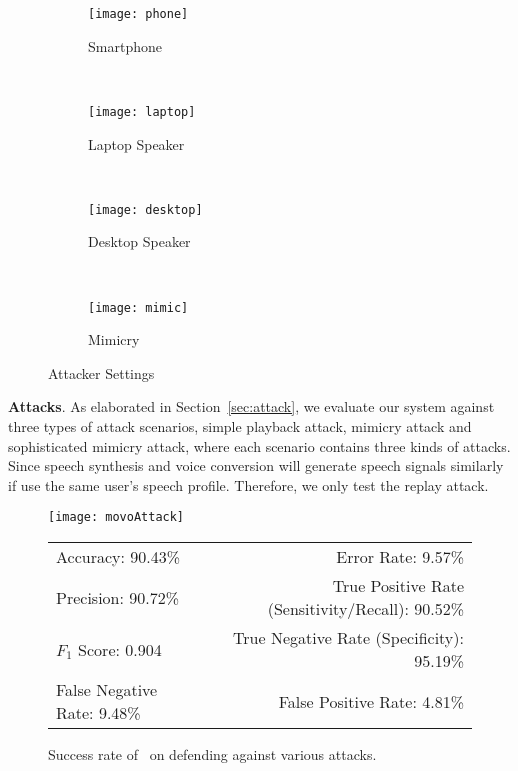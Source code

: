 \begin{figure}[!h]
	\centering
	\begin{subfigure}[t]{0.45\textwidth}
		\centering
		\texttt{[image: phone]}
		\caption{Smartphone}
	\end{subfigure}%
	~ 
	\begin{subfigure}[t]{0.45\textwidth}
		\centering
		\texttt{[image: laptop]}
		\caption{Laptop Speaker}
	\end{subfigure}
~ 
\begin{subfigure}[t]{0.45\textwidth}
	\centering
	\texttt{[image: desktop]}
	\caption{Desktop Speaker}
\end{subfigure}
	~
	\begin{subfigure}[t]{0.45\textwidth}
	\centering
	\texttt{[image: mimic]}
	\caption{Mimicry }
\end{subfigure}
	\caption{Attacker Settings}
	\label{fig:attacks}
\end{figure}





\textbf{Attacks}. As elaborated in Section~\ref{sec:attack}, we evaluate our system against three types of attack scenarios, simple playback attack, mimicry attack and sophisticated mimicry attack, where each scenario contains three kinds of attacks.  Since speech synthesis and voice conversion will generate speech signals similarly if use the same user's speech profile. Therefore, we only test the replay attack.

\begin{figure}[H]
	\centering
	\begin{minipage}{.35\linewidth}
		\texttt{[image: movoAttack]}
		\vspace{.05in}
	\end{minipage}
	
	\centering
	\begin{tabular}{lr}
		\toprule
		Accuracy: 90.43\% & \hspace{-.55in} Error Rate: 9.57\% \\
		Precision: 90.72\% & \hspace{-.55in} True Positive Rate (Sensitivity/Recall): 90.52\% \\
		$F_1$ Score: 0.904 & \hspace{-.55in} True Negative Rate (Specificity): 95.19\% \\
		False Negative Rate: 9.48\%  & \hspace{-.55in} False Positive Rate: 4.81\% \\
		\bottomrule
	\end{tabular}
	\caption{Success rate of \shortname~on defending against various attacks. }
	\label{fig:defend}
\end{figure}


